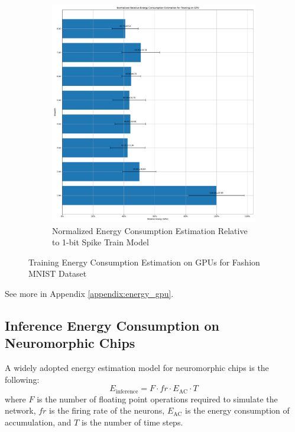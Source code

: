 \begin{figure}[!htpb]
\begin{subfigure}[H]{0.48\textwidth}
                \includegraphics[width=\textwidth]{../standard/FashionMNIST/plots/fashionmnist_train_relative_energy_gpu.pdf}
                \caption{Normalized Energy Consumption Estimation Relative to 1-bit Spike Train Model}
            \end{subfigure}
            \caption{Training Energy Consumption Estimation on GPUs for Fashion MNIST Dataset}
            \label{fig:training_energy_gpu}
        \end{figure}

        See more in Appendix \ref{appendix:energy_gpu}.

    \subsection{Inference Energy Consumption on Neuromorphic Chips}
    \label{subsec:inference_energy}
        A widely adopted energy estimation model for neuromorphic chips is the following:
        \begin{equation}
            \label{eq:inference_energy_popular}
            E_{\text{inference}} = F \cdot fr \cdot E_{\text{AC}} \cdot T
        \end{equation}
        where $F$ is the number of floating point operations required to simulate the network, $fr$ is the firing rate of the neurons, $E_{\text{AC}}$ is the energy consumption of accumulation, and $T$ is the number of time steps. 
    
